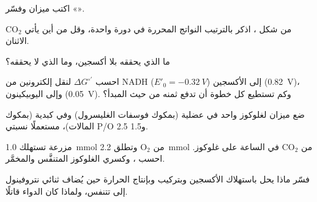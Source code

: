 \begin{exercise}[$\star$]\label{exo:b1:respiration-fermentation:2}
اكتب ميزان  وفسّر «».
\end{exercise}

\begin{exercise}[$\star$]\label{exo:b1:respiration-fermentation:3}
من شكل ، اذكر بالترتيب النواتج المحررة في دورة واحدة، وقل
من أين يأتي $\mathrm{CO_2}$ الاثنان.
\end{exercise}

\begin{exercise}[$\star$]\label{exo:b1:respiration-fermentation:4}
ما الذي يحققه   بلا أكسجين، وما الذي لا يحققه؟
\end{exercise}

\begin{exercise}[$\star\star$]\label{exo:b1:respiration-fermentation:5}
احسب $\Delta G^{\circ\prime}$ لنقل إلكترونين من NADH
($E'_0 = \qty{-0.32}{V}$) إلى الأكسجين (\qty{+0.82}{V})، وإلى
اليوبيكينون (\qty{+0.05}{V}). وكم  تستطيع كل خطوة أن تدفع ثمنه من
حيث المبدأ؟
\end{exercise}

\begin{exercise}[$\star\star$]\label{exo:b1:respiration-fermentation:6}
ضع ميزان  لغلوكوز واحد في  عضلية (بمكوك فوسفات الغليسرول) وفي
 كبدية (بمكوك المالات)، مستعملًا نسبتي P/O 2.5 و1.5.
\end{exercise}

\begin{exercise}[$\star\star$]\label{exo:b1:respiration-fermentation:7}
مزرعة تستهلك \qty{1.0}{mmol} من $\mathrm{O_2}$ وتطلق
\qty{2.2}{mmol} من $\mathrm{CO_2}$ في الساعة على غلوكوز. احسب ، وكسري الغلوكوز المتنفَّس والمخمَّر.
\end{exercise}

\begin{exercise}[$\star\star$]\label{exo:b1:respiration-fermentation:8}
فسّر ماذا يحل باستهلاك الأكسجين وبتركيب  وبإنتاج الحرارة حين
يُضاف ثنائي نتروفينول إلى  تتنفس، ولماذا كان الدواء قاتلًا.
\end{exercise}


